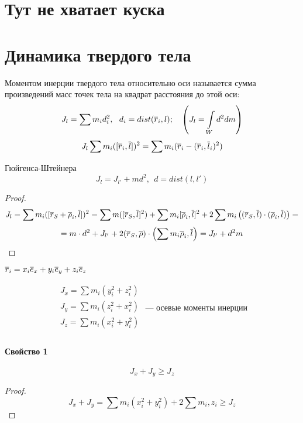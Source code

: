 \section{Тут не хватает куска}
\section{Динамика твердого тела}
\begin{df}
Моментом инерции твердого тела относительно оси называется сумма произведений масс точек тела на квадрат расстояния до этой оси:
\begin{equation}
	\label{nine.one}
	J_l = \sum m_i d_i^2,~~ d_i = dist({\overline{r}}_i, l);~~~ \left( J_l = \int\limits_W d^2 dm \right)
\end{equation}
\begin{equation}
	\label{nine.two}
	J_l \sum m_i([{\overline{r}}_i, {\overline{l}}])^2 = \sum m_i ({\overline{r}}_i - ({\overline{r}}_i, {\overline{l}}_i)^2)
\end{equation}
\end{df}

\begin{teo}{Гюйгенса-Штейнера}
\[
	J_l = J_{l'} + md^2,~~ d = dist(l, l')
\]
\end{teo}
\begin{proof}
\[
	J_l = \sum m_i ([{\overline{r}}_S + {\overline{\rho}}_i, {\overline{l}}])^2 = \sum m([{\overline{r}}_S, {\overline{l}}]^2) + \sum m_i[{\overline{\rho}}_i, {\overline{l}}]^2 + 2 \sum m_i \left( ({\overline{r}}_S, {\overline{l}}) \cdot ({\overline{\rho}}_i, {\overline{l}}) \right) = 
\]
\[ 
	= m \cdot d^2 + J_{l'} + 2({\overline{r}}_S, {\overline{\rho}}) \cdot \left( \sum m_i {\overline{\rho}}_i, {\overline{l}} \right) = J_{l'} + d^2 m
\]
\end{proof}


\noindent ${\overline{r}}_i = x_i{\overline{e}}_x + y_i {\overline{e}}_y + z_i {\overline{e}}_z$
\begin{df}
\[
\begin{array}{l}
J_x = \sum m_i (y_i^2 + z_i^2) \\
J_y = \sum m_i (z_i^2 + x_i^2) \\
J_z = \sum m_i (x_i^2 + y_i^2) \\
\end{array} \text{ --- осевые моменты инерции}
\]
\end{df}

\paragraph*{Свойство 1} \[
	J_x + J_y \geqslant J_z
\]
\begin{proof}
\[
	J_x + J_y = \sum m_i(x_i^2 + y_i^2) + 2\sum m_i, z_i \geqslant J_z
\]
\end{proof}

